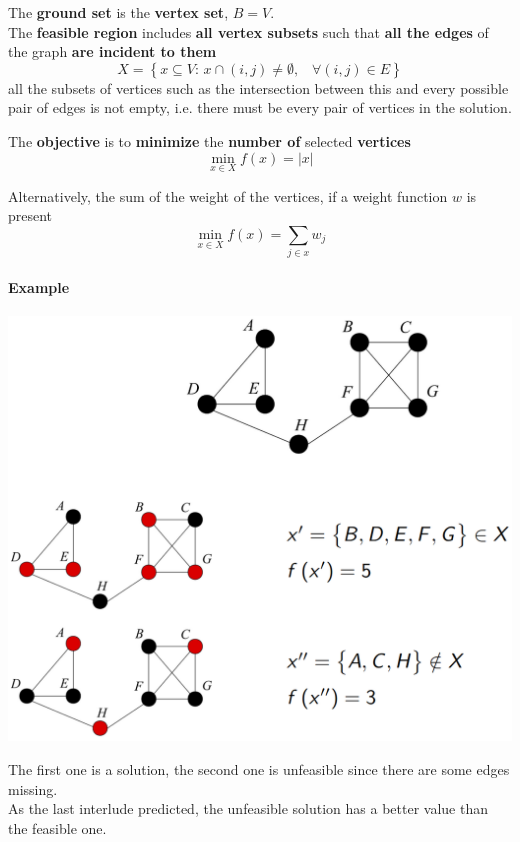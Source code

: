 The \textbf{ground set} is the \textbf{vertex set}, $B = V$.\\

The \textbf{feasible region} includes \textbf{all vertex subsets} such that \textbf{all the edges} of the graph \textbf{are incident to them}
$$ X = \left\{x \subseteq V : \, x \cap (i,j) \neq \emptyset, \;\;\; \forall (i,j) \in E \right\}$$
all the subsets of vertices such as the intersection between this and every possible pair of edges is not empty, i.e. there must be every pair of vertices in the solution.

The \textbf{objective} is to \textbf{minimize} the \textbf{number of} selected \textbf{vertices}
$$ \min_{x \in X} f(x) = |x| $$

Alternatively, the sum of the weight of the vertices, if a weight function $w$ is present
$$ \min_{x \in X} f(x) = \sum_{j \in x} w_j $$

\newpage

\paragraph{Example}
\begin{center}
	\includegraphics[width=\columnwidth]{img/VCP1}
\end{center}
The first one is a solution, the second one is unfeasible since there are some edges missing.\\
As the last interlude predicted, the unfeasible solution has a better value than the feasible one.\\

